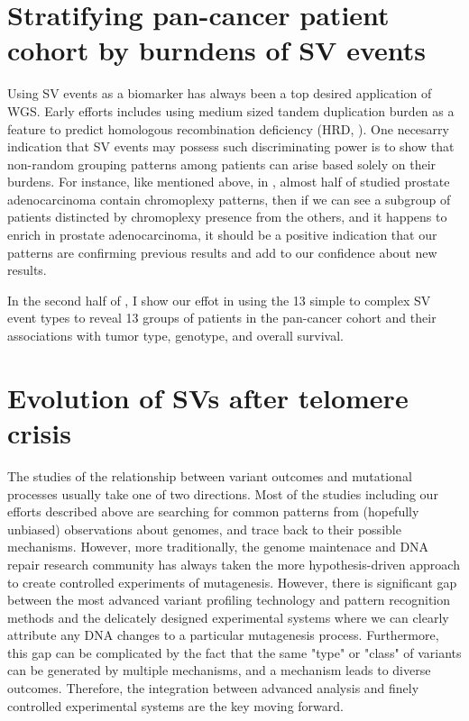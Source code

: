 \documentclass[phd,tocprelim]{cornell}
\begin{document}
\section{Stratifying pan-cancer patient cohort by burndens of SV events}
Using SV events as a biomarker has always been a top desired application of WGS. Early efforts includes using medium sized tandem duplication burden as a feature to predict homologous recombination deficiency (HRD, \cite{Davies:2017642}). One necesarry indication that SV events may possess such discriminating power is to show that non-random grouping patterns among patients can arise based solely on their burdens. For instance, like mentioned above, in \cite{baca2013}, almost half of studied prostate adenocarcinoma contain chromoplexy patterns, then if we can see a subgroup of patients distincted by chromoplexy presence from the others, and it happens to enrich in prostate adenocarcinoma, it should be a positive indication that our patterns are confirming previous results and add to our confidence about new results.

In the second half of , I show our effot in using the 13 simple to complex SV event types to reveal 13 groups of patients in the pan-cancer cohort and their associations with tumor type, genotype, and overall survival. 

\section{Evolution of SVs after telomere crisis}
The studies of the relationship between variant outcomes and mutational processes usually take one of two directions. Most of the studies including our efforts described above are searching for common patterns from (hopefully unbiased) observations about genomes, and trace back to their possible mechanisms. However, more traditionally, the genome maintenace and DNA repair research community has always taken the more hypothesis-driven approach to create controlled experiments of mutagenesis. However, there is significant gap between the most advanced variant profiling technology and pattern recognition methods and the delicately designed experimental systems where we can clearly attribute any DNA changes to a particular mutagenesis process. Furthermore, this gap can be complicated by the fact that the same "type" or "class" of variants can be generated by multiple mechanisms, and a mechanism leads to diverse outcomes. Therefore, the integration between advanced analysis and finely controlled experimental systems are the key moving forward.
\end{document}
